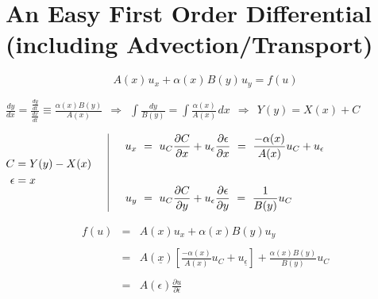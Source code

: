 \documentclass[12pt]{article}
\newcommand{\hs}{\hspace{1pt}}
\begin{document}
\section{An Easy First Order Differential {\small(including Advection/Transport)}}

\vspace{5pt}
\boldmath \[A(x)\hs u_x + \alpha(x)\hs B(y)\hs u_y = f(u)\] \unboldmath

\vspace{20pt}
\(\displaystyle 
	\frac{dy}{dx} = \frac{ \frac{dy}{dt} }{ \frac{dx}{dt} } \equiv \frac{\alpha(x) B(y)}{A(x)}\ 
	\ \Rightarrow\ 
	\ \int \frac{dy}{B(y)} = \int \frac{\alpha(x)}{A(x)}\hs dx \ \ \Rightarrow\ \ Y(y) = X(x) + C 
\)

\vspace{30pt} \noindent
\(
	\begin{aligned}
		C &= Y(y)-X(x) \\
		\epsilon &= x \\
	\end{aligned}
	\hspace{15pt} \vline \hspace{15pt}
	\begin{aligned}
		u_x &\ =\ u_C\displaystyle \frac{\partial C}{\partial x} 
			+ u_{\epsilon}\frac{\partial \epsilon}{\partial x}
			\ =\ \frac{-\alpha(x)}{A(x)} u_C 
			+ u_{\epsilon}
			\\[20pt]
		u_y &\ =\ u_C\displaystyle \frac{\partial C}{\partial y}
			+ u_{\epsilon}\frac{\partial \epsilon}{\partial y}
			\ =\ \frac{1}{B(y)} u_C
	\end{aligned}
\)

\vspace{20pt}
\begin{eqnarray*}
	f(u) &=& A(x) u_x + \alpha(x) B(y) u_y \\ \\
	&=& A( \underline{x} ) \left[ \frac{ -\alpha(x) }{ A(x) } u_C + u_{\underline{\epsilon}} \right] 
		+ \frac{ \alpha(x) B(y) }{ B(y) } u_C 
		\\ \\
	&=& A(\epsilon) \frac{\partial u}{\partial \epsilon} \\ \\
\end{eqnarray*}
\end{document}
